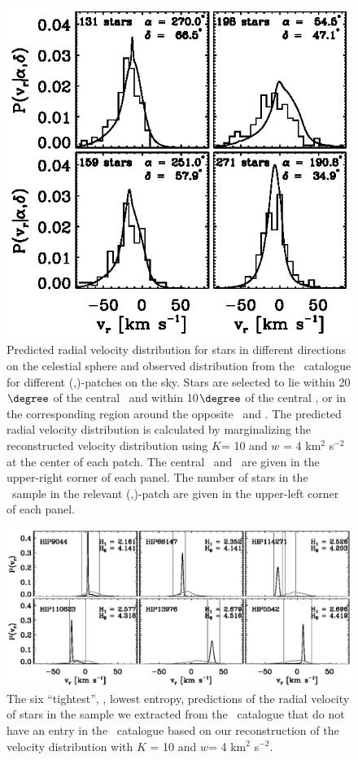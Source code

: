 \clearpage
\begin{figure}
\includegraphics{radecpatches.ps}
\caption{Predicted radial velocity distribution for stars in different directions on the celestial sphere and observed distribution from the \gcsabb\ catalogue for different (\ra,\dec)-patches on the sky. Stars are selected to lie within 20$\degree$ of the central \ra\ and within 10$\degree$ of the central \dec, or in the corresponding region around the opposite \ra\ and \dec. The predicted radial velocity distribution is calculated by marginalizing the reconstructed velocity distribution using $K$= 10 and $w$ = 4 km$^2$ s$^{-2}$ at the center of each patch. The central \ra\ and \dec\ are given in the upper-right corner of each panel. The number of stars in the \gcsabb\ sample in the relevant (\ra,\dec)-patch are given in the upper-left corner of each panel.}%
\label{fig:radecpatches}
\end{figure}


\clearpage
\begin{figure}
\includegraphics{info_hip_low.ps}
\caption{The six ``tightest'', \ie, lowest entropy, predictions of the radial velocity of stars in the sample we extracted from the \Hipparcos\ catalogue that do not have an entry in the \gcsabb\ catalogue based on our reconstruction of the velocity distribution with $K$ = 10 and $w$= 4 km$^2$ s$^{-2}$.}%
\label{fig:info_hip_low}
\end{figure}

